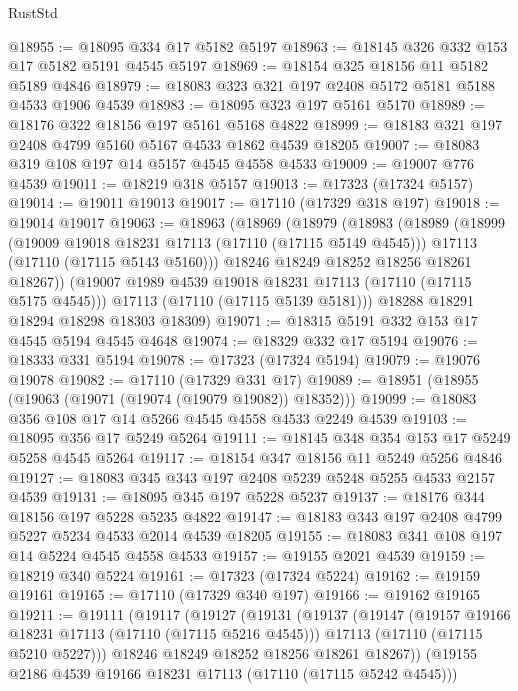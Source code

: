 \begin{lexlean}{RustStd}
\begin{coremodule}
@18955 := @18095 @334 @17 @5182 @5197
@18963 := @18145 @326 @332 @153 @17 @5182 @5191 @4545 @5197
@18969 := @18154 @325 @18156 @11 @5182 @5189 @4846
@18979 := @18083 @323 @321 @197 @2408 @5172 @5181 @5188 @4533 @1906 @4539
@18983 := @18095 @323 @197 @5161 @5170
@18989 := @18176 @322 @18156 @197 @5161 @5168 @4822
@18999 := @18183 @321 @197 @2408 @4799 @5160 @5167 @4533 @1862 @4539 @18205
@19007 := @18083 @319 @108 @197 @14 @5157 @4545 @4558 @4533
@19009 := @19007 @776 @4539
@19011 := @18219 @318 @5157
@19013 := @17323 (@17324 @5157)
@19014 := @19011 @19013
@19017 := @17110 (@17329 @318 @197)
@19018 := @19014 @19017
@19063 := @18963
    (@18969
      (@18979
        (@18983
          (@18989
            (@18999
              (@19009 @19018 @18231 @17113 (@17110 (@17115 @5149 @4545)))
              @17113
              (@17110 (@17115 @5143 @5160)))
            @18246
            @18249
            @18252
            @18256
            @18261
            @18267))
        (@19007 @1989 @4539 @19018 @18231 @17113 (@17110 (@17115 @5175 @4545)))
        @17113
        (@17110 (@17115 @5139 @5181)))
      @18288
      @18291
      @18294
      @18298
      @18303
      @18309)
@19071 := @18315 @5191 @332 @153 @17 @4545 @5194 @4545 @4648
@19074 := @18329 @332 @17 @5194
@19076 := @18333 @331 @5194
@19078 := @17323 (@17324 @5194)
@19079 := @19076 @19078
@19082 := @17110 (@17329 @331 @17)
@19089 := @18951 (@18955 (@19063 (@19071 (@19074 (@19079 @19082)) @18352)))
@19099 := @18083 @356 @108 @17 @14 @5266 @4545 @4558 @4533 @2249 @4539
@19103 := @18095 @356 @17 @5249 @5264
@19111 := @18145 @348 @354 @153 @17 @5249 @5258 @4545 @5264
@19117 := @18154 @347 @18156 @11 @5249 @5256 @4846
@19127 := @18083 @345 @343 @197 @2408 @5239 @5248 @5255 @4533 @2157 @4539
@19131 := @18095 @345 @197 @5228 @5237
@19137 := @18176 @344 @18156 @197 @5228 @5235 @4822
@19147 := @18183 @343 @197 @2408 @4799 @5227 @5234 @4533 @2014 @4539 @18205
@19155 := @18083 @341 @108 @197 @14 @5224 @4545 @4558 @4533
@19157 := @19155 @2021 @4539
@19159 := @18219 @340 @5224
@19161 := @17323 (@17324 @5224)
@19162 := @19159 @19161
@19165 := @17110 (@17329 @340 @197)
@19166 := @19162 @19165
@19211 := @19111
    (@19117
      (@19127
        (@19131
          (@19137
            (@19147
              (@19157 @19166 @18231 @17113 (@17110 (@17115 @5216 @4545)))
              @17113
              (@17110 (@17115 @5210 @5227)))
            @18246
            @18249
            @18252
            @18256
            @18261
            @18267))
        (@19155 @2186 @4539 @19166 @18231 @17113 (@17110 (@17115 @5242 @4545)))

\end{coremodule}
\end{lexlean}
